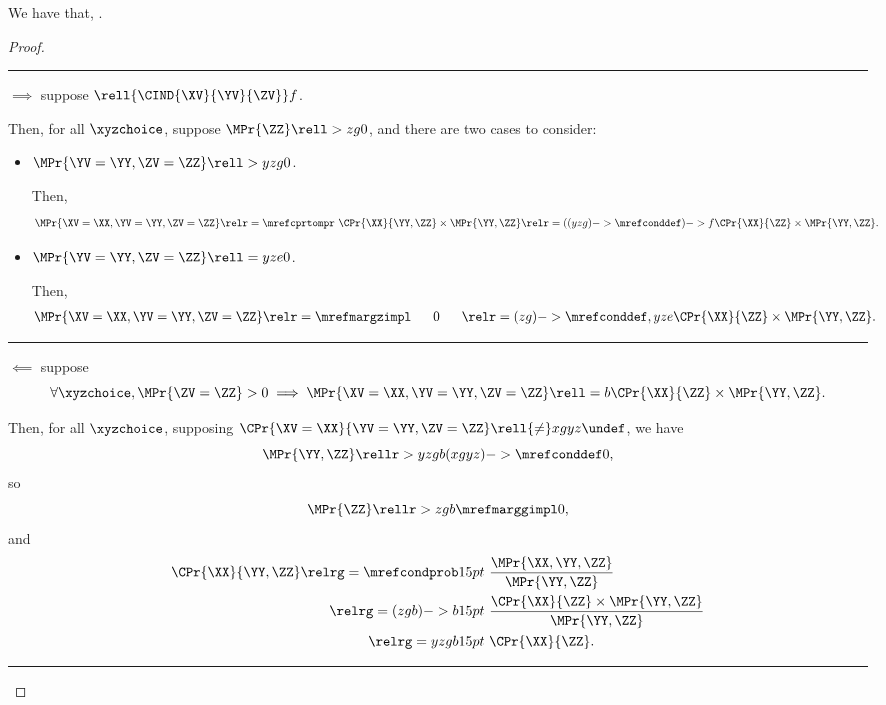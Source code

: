 \begin{proposition}
  We have that, \indcptompdef.%
\end{proposition}

\begin{proof}
  \hrule
  $\implies$ suppose $\rell {\CIND{\XV}{\YV}{\ZV}} f $.

  Then, for all $\xyzchoice$, suppose $\MPr{\ZZ} \rell > zg 0$, and
  there are two cases to consider:
  \begin{itemize}
    \item {} $\MPr{\YV = \YY,\ZV = \ZZ} \rell > yzg 0$.

      Then, 
      \begin{align*}
        \MPr{\XV = \XX, \YV = \YY, \ZV = \ZZ} \relr = {\mrefcprtompr} &\ \CPr{\XX}{\YY, \ZZ} \times \MPr{\YY, \ZZ}
        \relr = {((yzg)->\mrefconddef)->f} \CPr{\XX}{\ZZ} \times \MPr{\YY, \ZZ}.
      \end{align*}
    \item {} $\MPr{\YV = \YY,\ZV = \ZZ} \rell = yze 0$.

      Then,
      \begin{align*}
        \MPr{\XV = \XX, \YV = \YY, \ZV = \ZZ} \relr = {\mrefmargzimpl} &\ \ \ \ \ 0\ \ \ \ \ 
        \relr = {{(zg)->\mrefconddef},yze} \CPr{\XX}{\ZZ} \times \MPr{\YY, \ZZ}.
      \end{align*}
  \end{itemize}
  \hrule
  $\impliedby$ suppose 
  $$
    \forall \xyzchoice,  
    \MPr{\ZV = \ZZ} > 0 \implies 
    \MPr{\XV = \XX, \YV = \YY, \ZV = \ZZ} \rell = b
    \CPr{\XX}{\ZZ}
    \times
    \MPr{\YY, \ZZ}
.$$

  Then, for all $\xyzchoice$, supposing $\CPr{\XV = \XX}{\YV = \YY, \ZV = \ZZ} \rell {\ne} xgyz \undef$, we have
  $$\MPr{\YY, \ZZ} \rellr > yzgb {(xgyz)->\mrefconddef} 0,$$
  so
  $$\MPr{\ZZ} \rellr > zgb {\mrefmarggimpl} 0,$$
  and
  \begin{align*}
    \CPr{\XX}{\YY, \ZZ} \relrg = {\mrefcondprob} 15pt &\ \frac{\MPr{\XX, \YY, \ZZ}}{\MPr{\YY, \ZZ}}\\
    \relrg = {(zgb)->b} 15pt &\ \frac{\CPr{\XX}{\ZZ} \times \MPr{\YY, \ZZ}}{\MPr{\YY, \ZZ}}\\
    \relrg = {yzgb} 15pt &\ \CPr{\XX}{\ZZ}.
  \end{align*}
  \hrule
\end{proof}

